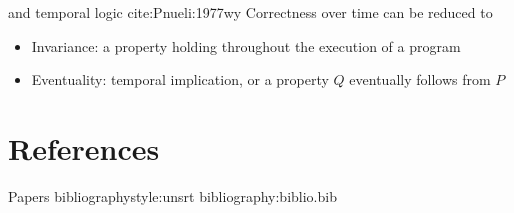 \documentclass[aspectratio=169]{beamer}
\begin{document}
\begin{frame}[label={sec:orgf6cd9f1}]{and temporal logic cite:Pnueli:1977wy}
Correctness over time can be reduced to

\begin{itemize}
\item \alert{Invariance}: a property holding throughout the execution of a program

\item \alert{Eventuality}: temporal implication, or a property \(Q\) eventually follows from \(P\)
\end{itemize}
\end{frame}










\section{References}
\label{sec:orgb698d83}
\begin{frame}[label={sec:org170832c}]{Papers}
bibliographystyle:unsrt
bibliography:biblio.bib
\end{frame}
\end{document}
